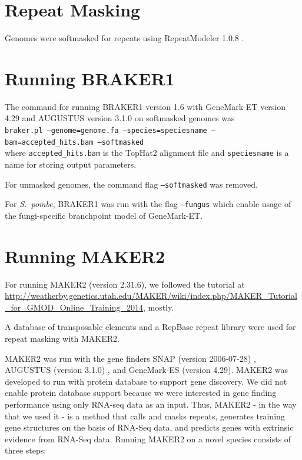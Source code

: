 \documentclass[a4paper,10pt]{report}
\begin{document}
\section{Repeat Masking}

Genomes were softmasked for repeats using RepeatModeler 1.0.8 \cite{RepeatModeler}.

\section{Running BRAKER1}

The command for running BRAKER1 version 1.6 with GeneMark-ET version 4.29 and AUGUSTUS version 3.1.0 on softmasked genomes was\\

\noindent \texttt{braker.pl --genome=genome.fa --species=speciesname --bam=accepted\_hits.bam --softmasked}\\

\noindent where \texttt{accepted\_hits.bam} is the TopHat2 alignment file and \texttt{speciesname} is a name for storing output parameters.

\noindent For unmasked genomes, the command flag \texttt{--softmasked} was removed.

\noindent For \textit{S.~pombe}, BRAKER1 was run with the flag \texttt{--fungus} which enable usage of the fungi-specific branchpoint model of GeneMark-ET.

\section{Running MAKER2}

For running MAKER2 (version 2.31.6), we followed the tutorial at \url{http://weatherby.genetics.utah.edu/MAKER/wiki/index.php/MAKER_Tutorial_for_GMOD_Online_Training_2014}, mostly.

A database of transposable elements and a RepBase repeat library were used for repeat masking with MAKER2.

MAKER2 was run with the gene finders SNAP (version 2006-07-28) \cite{SNAP}, AUGUSTUS (version 3.1.0) \cite{AUGUSTUS}, and GeneMark-ES \cite{GeneMark-ES} (version 4.29). MAKER2 was developed to run with protein database to support gene discovery. We did not enable protein database support because we were interested in gene finding performance using only RNA-seq data as an input. Thus, MAKER2 - in the way that we used it - is a method that calls and masks repeats, generates training gene structures on the basis of RNA-Seq data, and predicts genes with extrinsic evidence from RNA-Seq data. Running MAKER2 on a novel species consists of three steps: 
\end{document}
